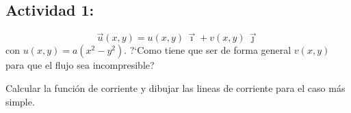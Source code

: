 	
\subsection*{Actividad 1:}
		\[
		\vec{u}(x,y)=u(x,y)\,\vec{\imath}+v(x,y)\,\vec{\jmath}
		\]
		con $u(x,y)=a(x^{2}-y^{2})$. ?`Como tiene que ser de forma general
		$v(x,y)$ para que el flujo sea incompresible?
		
		Calcular la función de corriente y dibujar las lineas de corriente
		para el caso más simple.

